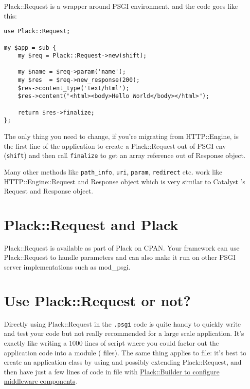 Plack::Request is a wrapper around PSGI environment, and the code goes
like this:

\begin{lstlisting}
use Plack::Request;

my $app = sub {
    my $req = Plack::Request->new(shift);
    
    my $name = $req->param('name');
    my $res  = $req->new_response(200);
    $res->content_type('text/html');
    $res->content("<html><body>Hello World</body></html>");
    
    return $res->finalize;
};
\end{lstlisting}

The only thing you need to change, if you're migrating from
HTTP::Engine, is the first line of the application to create a
Plack::Request out of PSGI env (\lstinline!shift!) and then call
\lstinline!finalize! to get an array reference out of Response object.

Many other methods like \lstinline!path_info!, \lstinline!uri!,
\lstinline!param!, \lstinline!redirect! etc. work like
HTTP::Engine::Request and Response object which is very similar to
\href{http://search.cpan.org/dist/Catalyst-Runtime}{Catalyst} 's Request
and Response object.

\section{Plack::Request and Plack}\label{plackrequest-and-plack}

Plack::Request is available as part of Plack on CPAN. Your framework can
use Plack::Request to handle parameters and can also make it run on
other PSGI server implementations such as mod\_psgi.

\section{Use Plack::Request or not?}\label{use-plackrequest-or-not}

Directly using Plack::Request in the \lstinline!.psgi! code is quite
handy to quickly write and test your code but not really recommended for
a large scale application. It's exactly like writing a 1000 lines of
 script where you could factor out the application code
into a module ( files). The same thing applies to
 file: it's best to create an application class by
using and possibly extending Plack::Request, and then have just a few
lines of code in  file with
\href{http://advent.plackperl.org/2009/12/day-11-using-plackbuilder.html}{Plack::Builder
to configure middleware components}.

